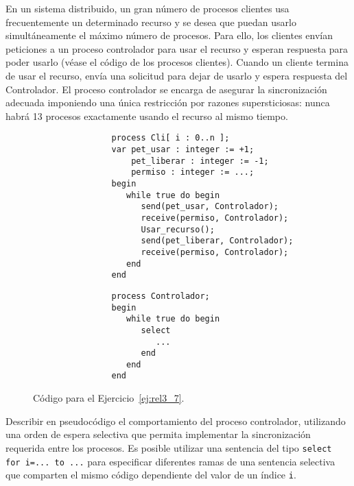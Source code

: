 \begin{ejercicio}\label{ej:rel3_7}
    En un sistema distribuido, un gran número de procesos clientes usa frecuentemente un determinado recurso y se desea que puedan usarlo simultáneamente el máximo número de procesos. Para ello, los clientes envían peticiones a un proceso controlador para usar el recurso y esperan respuesta para poder usarlo (véase el código de los procesos clientes). Cuando un cliente termina de usar el recurso, envía una solicitud para dejar de usarlo y espera respuesta del Controlador. El proceso controlador se encarga de asegurar la sincronización adecuada imponiendo una única restricción por razones supersticiosas: nunca habrá 13 procesos exactamente usando el recurso al mismo tiempo.
    \begin{figure}[H]
        \centering
        \setlength{\columnsep}{1cm}
        \begin{multicols}{2}
            \begin{verbatim}
                process Cli[ i : 0..n ];
                var pet_usar : integer := +1;
                    pet_liberar : integer := -1;
                    permiso : integer := ...;
                begin
                   while true do begin
                      send(pet_usar, Controlador);
                      receive(permiso, Controlador);
                      Usar_recurso();
                      send(pet_liberar, Controlador);
                      receive(permiso, Controlador);
                   end
                end
            \end{verbatim}
            \begin{verbatim}
                process Controlador;
                begin
                   while true do begin
                      select
                         ...
                      end
                   end
                end
            \end{verbatim}
        \end{multicols}
        \caption{Código para el Ejercicio~\ref{ej:rel3_7}.}
        \label{fig:cod_7}
    \end{figure}
    Describir en pseudocódigo el comportamiento del proceso controlador, utilizando una orden de espera selectiva que permita implementar la sincronización requerida entre los procesos. Es posible utilizar una sentencia del tipo \verb|select for i=... to ...| para especificar diferentes ramas de una sentencia selectiva que comparten el mismo código dependiente del valor de un índice \verb|i|.
\end{ejercicio}

